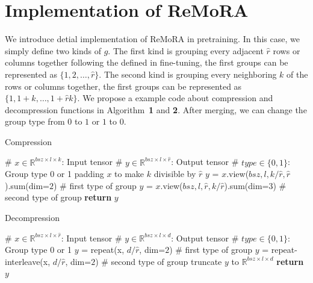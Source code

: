 \documentclass[11pt]{article}
\begin{document}
\section{Implementation of ReMoRA}
\label{sec:ReMoRA}
We introduce detial implementation of ReMoRA in pretraining.
In this case, we simply define two kinds of $g$.
The first kind is grouping every adjacent \( \hat{r} \) rows or columns together following the defined in fine-tuning, the first groups can be represented as \(\{1, 2, \ldots, \hat{r}\}\).
The second kind is grouping every neighboring $k$ of the rows or columns together, the first groups can be represented as \(\{1, 1+k, \ldots, 1+\hat{r}k\}\).
We propose a example code about compression and decompression functions in Algorithm~\textbf{1} and \textbf{2}.
After merging, we can change the group type from $0$ to $1$ or $1$ to $0$.

\begin{algorithm}
  \label{alg:compress}
  \small
\caption{Compression}
\begin{algorithmic}[1]
    \State \# $x\in\mathbb{R}^{bsz \times l  \times k}$: Input tensor
    \State \# $y\in\mathbb{R}^{bsz \times l  \times \hat{r}}$: Output tensor
    \State \# $type \in \{0, 1\}$: Group type 0 or 1
    \State padding $x$ to make $k$ divisible by $\hat{r}$
          \State $y$ = $x$.view($bsz, l, k/\hat{r}, \hat{r}$).sum(dim=$2$) \# first type of group
    \Else
          \State $y$ = $x$.view($bsz, l, \hat{r}, k/\hat{r}$).sum(dim=$3$) \# second type of group
    \EndIf
    \State \textbf{return} $y$
\EndFunction
\end{algorithmic}
\end{algorithm}

\begin{algorithm}
  \label{alg:decompress}
  \small
\caption{Decompression}
\begin{algorithmic}[1]
    \State \# $x\in\mathbb{R}^{bsz \times l  \times \hat{r}}$: Input tensor
    \State \# $y\in\mathbb{R}^{bsz \times l  \times d}$: Output tensor
    \State \# $type \in \{0, 1\}$: Group type 0 or 1
          \State $y$ = repeat(x, $d/\hat{r}$, dim=$2$) \# first type of group
    \Else
          \State $y$ = repeat-interleave(x, $d/\hat{r}$, dim=$2$) \# second type of group
    \EndIf
    \State truncate $y$ to $\mathbb{R}^{bsz \times l  \times d}$
    \State \textbf{return} $y$
\EndFunction
\end{algorithmic}
\end{algorithm}
\end{document}
